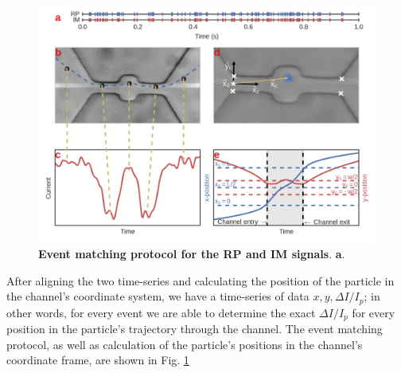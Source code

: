 		\begin{figure}
			\includegraphics[width=1\textwidth]{rpimsync}
			\caption{\textbf{Event matching protocol for the RP and IM signals}. \textbf{a}.}
			\label{fig:rpimsync}
		\end{figure}

		
		After aligning the two time-series and calculating the position of the particle in the channel's coordinate system, we have a time-series of data $x, y, \Delta I/I_{p}$; in other words, for every event we are able to determine the exact $\Delta I/I_{p}$ for every position in the particle's trajectory through the channel. The event matching protocol, as well as calculation of the particle's positions in the channel's coordinate frame, are shown in Fig. \ref{fig:rpimsync}



